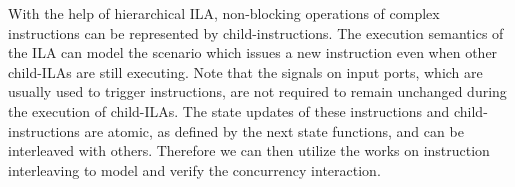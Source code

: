 With the help of hierarchical ILA, non-blocking operations of complex 
instructions can be represented by child-instructions.
The execution semantics of the ILA can model the scenario which issues a new
instruction even when other child-ILAs are still executing.
%
Note that the signals on input ports, which are usually used to trigger 
instructions, are not required to remain unchanged during the execution of 
child-ILAs.
The state updates of these instructions and child-instructions are atomic, as 
defined by the next state functions, and can be interleaved with others.
%
Therefore we can then utilize the works on instruction interleaving to model
and verify the concurrency interaction.

